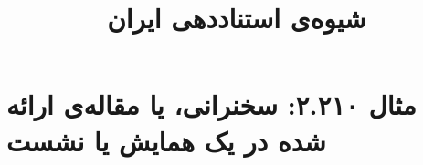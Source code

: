\documentclass[a4paper,10pt]{article}
\begin{document}
\title{شیوه‌ی استناددهی ایران
 }
\author{}
\date{}
\maketitle



\section*{مثال ۲.۲۱۰: سخنرانی، یا مقاله‌ی ارائه شده در یک همایش یا نشست}

\cite{صابری1385}\\
\cite{oguinn1987}\\






\end{document}
